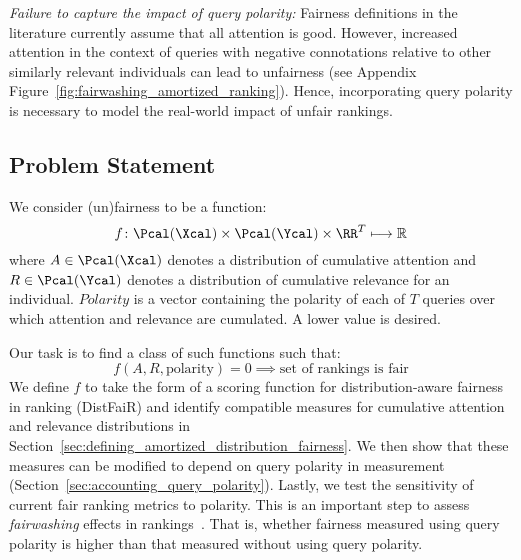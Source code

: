 \emph{Failure to capture the impact of query polarity:} Fairness definitions in the literature currently assume that all attention is good. However, increased attention in the context of queries with negative connotations relative to other similarly relevant individuals can lead to unfairness (see Appendix Figure~\ref{fig:fairwashing_amortized_ranking}). %
Hence, incorporating query polarity is necessary to model the real-world impact of unfair rankings. %

\subsection{Problem Statement}
We consider (un)fairness to be a function:
\begin{equation}
  f \colon \Pcal(\Xcal) \times \Pcal(\Ycal) \times \RR^T \longmapsto \mathbb{R}
\end{equation}
where $A \in \Pcal(\Xcal)$ denotes a distribution of cumulative attention and $R \in \Pcal(\Ycal)$ denotes a distribution of cumulative relevance for an individual. $Polarity$ is a vector containing the polarity of each of $T$ queries over which attention and relevance are cumulated. A lower value is desired.

Our task is to find a class of such functions such that:
\begin{equation}
    f(A, R, \text{polarity}) = 0 \implies \text{set of rankings is fair}
\end{equation}
We define $f$ to take the form of a scoring function for distribution-aware fairness in ranking (DistFaiR) and identify compatible measures for cumulative attention and relevance distributions in Section~\ref{sec:defining_amortized_distribution_fairness}. We then show that these measures can be modified to depend on query polarity in measurement (Section~\ref{sec:accounting_query_polarity}). Lastly, we test the sensitivity of current fair ranking metrics to polarity. This is an important step to assess \emph{fairwashing} effects in rankings~\cite{aivodji2019fairwashing}.  That is, whether fairness measured using query polarity is higher than that measured without using query polarity.




    










